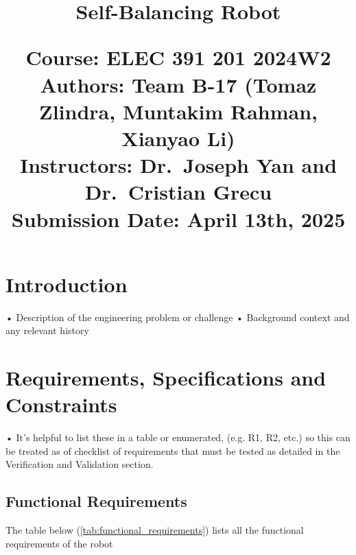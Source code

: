 \documentclass{article}
\title{
    \Huge \textbf{Self-Balancing Robot}

    \vspace{100px}

    \large Course: ELEC 391 201 2024W2 \\[1em]
    \large Authors: Team B-17 (Tomaz Zlindra, Muntakim Rahman, Xianyao Li) \\[1em]
    \large Instructors: Dr.\ Joseph Yan and Dr.\ Cristian Grecu \\[1em]
    \large Submission Date: April 13th, 2025 \\
}
\date{} %
\begin{document}
\maketitle

\newpage %

\tableofcontents %

\newpage %

\section{Introduction}

• Description of the engineering problem or challenge
• Background context and any relevant history

\section{Requirements, Specifications and Constraints}
• It's helpful to list these in a table or enumerated, (e.g. R1, R2, etc.) so this can be treated as of checklist of
requirements that must be tested as detailed in the Verification and Validation section.
\subsection{Functional Requirements}

The table below (\ref{tab:functional_requirements}) lists all the functional requirements of the robot
\end{document}
